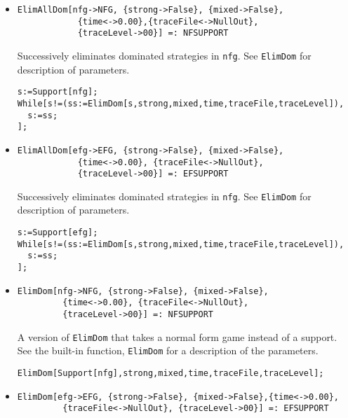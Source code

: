 \begin{itemize}
\item{}
\protect \large \begin{verbatim}
ElimAllDom[nfg->NFG, {strong->False}, {mixed->False},
            {time<->0.00},{traceFile<->NullOut}, 
            {traceLevel->00}] =: NFSUPPORT
\end{verbatim}\normalsize

\bd 
Successively eliminates dominated strategies in \verb+nfg+.  See
\verb+ElimDom+ for description of parameters.  
\begin{verbatim}
s:=Support[nfg];
While[s!=(ss:=ElimDom[s,strong,mixed,time,traceFile,traceLevel]),
  s:=ss;
];
\end{verbatim} 
\ed

\item{}
\protect \large \begin{verbatim}
ElimAllDom[efg->EFG, {strong->False}, {mixed->False},
            {time<->0.00}, {traceFile<->NullOut}, 
            {traceLevel->00}] =: EFSUPPORT
\end{verbatim}\normalsize

\bd 
Successively eliminates dominated strategies in \verb+nfg+. See
\verb+ElimDom+ for description of parameters.  
\begin{verbatim}
s:=Support[efg];
While[s!=(ss:=ElimDom[s,strong,mixed,time,traceFile,traceLevel]),
  s:=ss;
];
\end{verbatim} 
\ed

\item{}
\protect \large \begin{verbatim}
ElimDom[nfg->NFG, {strong->False}, {mixed->False}, 
         {time<->0.00}, {traceFile<->NullOut}, 
         {traceLevel->00}] =: NFSUPPORT
\end{verbatim}\normalsize

\bd 
A version of \verb+ElimDom+ that takes a normal form game instead
of a support.  See the built-in function, \verb+ElimDom+ for a
description of the parameters.
\begin{verbatim}
ElimDom[Support[nfg],strong,mixed,time,traceFile,traceLevel];
\end{verbatim} 
\ed

\item{}
\protect \large \begin{verbatim}
ElimDom[efg->EFG, {strong->False}, {mixed->False},{time<->0.00}, 
         {traceFile<->NullOut}, {traceLevel->00}] =: EFSUPPORT
\end{verbatim}\normalsize


\end{itemize}
